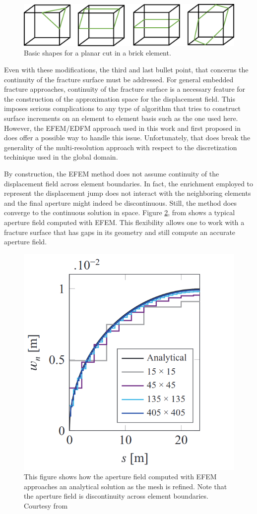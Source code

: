 \begin{figure}[h]
    \centering
    \includegraphics[width=0.8\linewidth]{Chapter4/figures/nonplanar/pre_cuts.png}
    \caption{Basic shapes for a planar cut in a brick element.}
    \label{fig:pre_cuts}
\end{figure}

Even with these modifications, the third and last bullet point, that concerns the continuity of the fracture surface must be addressed. For general embedded fracture approaches, continuity of the fracture surface is a necessary feature for the construction of the approximation space for the displacement field. This imposes serious complications to any type of algorithm that tries to construct surface increments on an element to element basis such as the one used here. However, the EFEM/EDFM approach used in this work and first proposed in \cite{cusini2021simulation} does offer a possible way to handle this issue. Unfortunately, that does break the generality of the multi-resolution approach with respect to the discretization techinique used in the global domain. 

By construction, the EFEM method does not assume continuity of the displacement field across element boundaries. In fact, the enrichment employed to represent the displacement jump does not interact with the neighboring elements and the final aperture might indeed be discontinuous. Still, the method does converge to the continuous solution in space. Figure \ref{fig:efem_apertures}, from \cite{cusini2021simulation} shows a typical aperture field computed with EFEM. This flexibility allows one to work with a fracture surface that has gaps in its geometry and still compute an accurate aperture field. 

\begin{figure}[h]
    \centering
    \includegraphics[width=0.5\linewidth]{Chapter4/figures/nonplanar/efem_aperture.png}
    \caption{This figure shows how the aperture field computed with EFEM approaches an analytical solution as the mesh is refined. Note that the aperture field is discontinuity across element boundaries. Courtesy from \cite{cusini2021simulation}}
    \label{fig:efem_apertures}
\end{figure}

